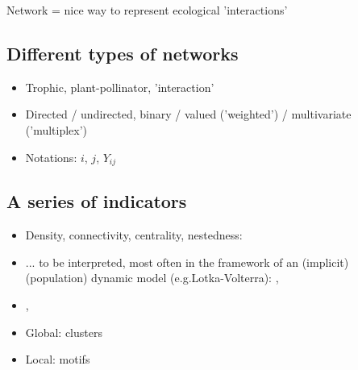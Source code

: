 Network = nice way to represent ecological 'interactions' \cite{Bas09}

\subsection{Different types of networks}

\begin{itemize}
 \item Trophic, plant-pollinator, 'interaction'
 \item Directed / undirected, binary / valued ('weighted') / multivariate ('multiplex')
 \item Notations: $i$, $j$, $Y_{ij}$
\end{itemize}

\subsection{A series of indicators}

\begin{itemize}
 \item Density, connectivity, centrality, nestedness: \cite{BJM03}
 \item ... to be interpreted, most often in the framework of an (implicit) (population) dynamic model (e.g.Lotka-Volterra): \cite{ThF10}, \cite{GiB12}
 \item \cite{Bas09}, 
 \item Global: clusters
 \item Local: motifs
\end{itemize}

